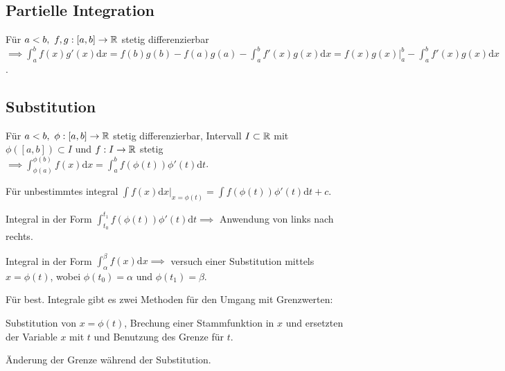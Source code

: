 \subsection{Partielle Integration}
Für $a < b,\ f,g: [a,b] \to \mathbb{R}$ stetig differenzierbar $\implies \int_{a}^{b} f(x)g'(x) \mathrm{d}x = f(b)g(b) - f(a)g(a) - \int_{a}^{b} f'(x)g(x) \mathrm{d}x  = f(x)g(x)|_a^b - \int_{a}^{b} f'(x)g(x) \mathrm{d}x$.

\subsection{Substitution}
Für $a < b, \ \phi: [a, b] \to \mathbb{R}$ stetig differenzierbar, Intervall $I \subset \mathbb{R}$ mit $\phi([a,b]) \subset I$ und $f: I \to \mathbb{R}$ stetig $\implies \int_{\phi(a)}^{\phi(b)} f(x) \mathrm{d}x = \int_{a}^{b} f(\phi(t)) \phi'(t) \mathrm{d}t$.
\begin{compactitem}
    \item Für unbestimmtes integral $\int f(x) \mathrm{d}x |_{x=\phi(t)} = \int f(\phi(t))\phi'(t) \mathrm{d}t + c$.
    \item Integral in der Form $\int_{t_0}^{t_1} f(\phi(t))\phi'(t)\mathrm{d}t \implies$ Anwendung von links nach rechts.
    \item Integral in der Form $\int_{\alpha}^{\beta} f(x) \mathrm{d}x \implies$ versuch einer Substitution mittels $x = \phi(t)$, wobei $\phi(t_0) = \alpha$ und $\phi(t_1) = \beta$.
    \item Für best. Integrale gibt es zwei Methoden für den Umgang mit Grenzwerten:
        \begin{compactitem}
            \item Substitution von $x=\phi(t)$, Brechung einer Stammfunktion in $x$ und ersetzten der Variable $x$ mit $t$ und Benutzung des Grenze für $t$.
            \item Änderung der Grenze während der Substitution.
        \end{compactitem}
\end{compactitem}

